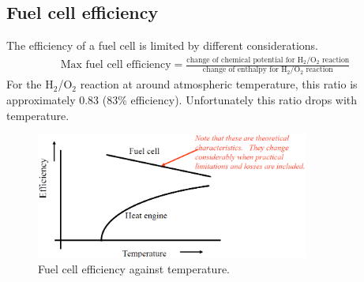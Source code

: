 \subsection{Fuel cell efficiency}
The efficiency of a fuel cell is limited by different considerations.
\begin{gather}
    \textrm{Max fuel cell efficiency} = \frac{\textrm{change of chemical potential for H$_2$/O$_2$ reaction}}{\textrm{change of enthalpy for H$_2$/O$_2$ reaction}}
\end{gather}
For the H$_2$/O$_2$ reaction at around atmospheric temperature, this ratio is approximately 0.83 (83\% efficiency). Unfortunately this ratio drops with temperature.
\begin{figure}[H]
    \centering
    \includegraphics[width = 0.8\textwidth]{img/figure113.png}
    \caption{Fuel cell efficiency against temperature.}
\end{figure}
